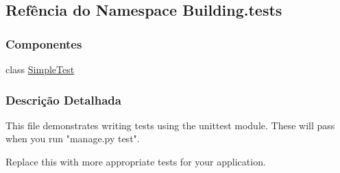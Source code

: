 \hypertarget{namespaceBuilding_1_1tests}{\subsection{Refência do Namespace Building.\-tests}
\label{namespaceBuilding_1_1tests}
}
\subsubsection*{Componentes}
\begin{DoxyCompactItemize}
\item 
class \hyperlink{classBuilding_1_1tests_1_1SimpleTest}{Simple\-Test}
\end{DoxyCompactItemize}


\subsubsection{Descrição Detalhada}
\begin{DoxyVerb}This file demonstrates writing tests using the unittest module. These will pass
when you run "manage.py test".

Replace this with more appropriate tests for your application.
\end{DoxyVerb}
 